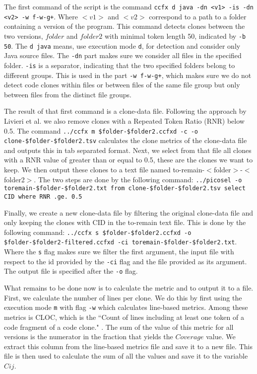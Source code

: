\documentclass[a4paper,twoside, twocolumn, 11pt]{article}
\numberwithin{equation}{section}
\begin{document}
The first command of the script is the command \texttt{ccfx d java -dn <v1> -is -dn <v2> -w f-w-g+}. 
Where $<v1>$ and $<v2>$ correspond to a path to a folder containing a version of the program.
This command detects clones between the two versions, $folder$ and $folder2$ with minimal token length 50, indicated by \texttt{-b 50}.
The \texttt{d java} means, use execution mode \texttt{d}, for detection and consider only Java source files.
The \texttt{-dn} part makes sure we consider all files in the specified folder.
\texttt{-is} is a separator, indicating that the two specified folders belong to different groups. 
This is used in the part \texttt{-w f-w-g+}, which makes sure we do not detect code clones within files or between files of the same file group but only between files from the distinct file groups.

The result of that first command is a clone-data file. Following the approach by Livieri et al. we also remove clones with a Repeated Token Ratio (RNR) below 0.5. 
The command \texttt{../ccfx m \$folder-\$folder2.ccfxd -c -o clone-\$folder-\$folder2.tsv} calculates the clone metrics of the clone-data file and outputs this in tab separated format. 
Next, we select from that file all clones with a RNR value of greater than or equal to 0.5, these are the clones we want to keep. 
We then output these clones to a text file named to-remain-$<$folder$>$-$<$folder2$>$. 
The two steps are done by the following command: \texttt{../picosel -o toremain-\$folder-\$folder2.txt from clone-\$folder-\$folder2.tsv select CID where RNR .ge. 0.5}

Finally, we create a new clone-data file by filtering the original clone-data file and only keeping the clones with CID in the to-remain text file.
This is done by the following command: \texttt{../ccfx s \$folder-\$folder2.ccfxd -o \$folder-\$folder2-filtered.ccfxd -ci toremain-\$folder-\$folder2.txt}.
Where the \texttt{s} flag makes sure we filter the first argument, the input file with respect to the id provided by the \texttt{-ci} flag and the file provided as its argument.
The output file is specified after the \texttt{-o} flag.

What remains to be done now is to calculate the metric and to output it to a file.
First, we calculate the number of lines per clone.
We do this by first using the execution mode \texttt{m} with flag \texttt{-w} which calculates line-based metrics.
Among these metrics is CLOC, which is the ``Count of lines including at least one token of a code fragment of a code clone." \cite{gemx tutorial}.
The sum of the value of this metric for all versions is the numerator in the fraction that yields the $Coverage$ value.
We extract this column from the line-based metrics file and save it to a new file.
This file is then used to calculate the sum of all the values and save it to the variable $Cij$.
\end{document}
